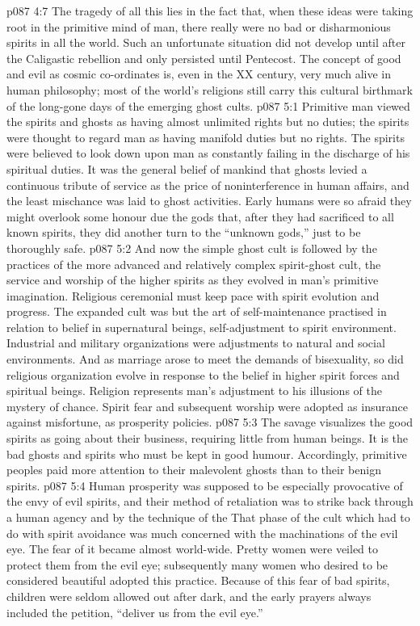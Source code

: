 \vs p087 4:7 The tragedy of all this lies in the fact that, when these ideas were taking root in the primitive mind of man, there really were no bad or disharmonious spirits in all the world. Such an unfortunate situation did not develop until after the Caligastic rebellion and only persisted until Pentecost. The concept of good and evil as cosmic co\hyp{}ordinates is, even in the XX century, very much alive in human philosophy; most of the world’s religions still carry this cultural birthmark of the long\hyp{}gone days of the emerging ghost cults.
\vs p087 5:1 Primitive man viewed the spirits and ghosts as having almost unlimited rights but no duties; the spirits were thought to regard man as having manifold duties but no rights. The spirits were believed to look down upon man as constantly failing in the discharge of his spiritual duties. It was the general belief of mankind that ghosts levied a continuous tribute of service as the price of noninterference in human affairs, and the least mischance was laid to ghost activities. Early humans were so afraid they might overlook some honour due the gods that, after they had sacrificed to all known spirits, they did another turn to the “unknown gods,” just to be thoroughly safe.
\vs p087 5:2 And now the simple ghost cult is followed by the practices of the more advanced and relatively complex spirit\hyp{}ghost cult, the service and worship of the higher spirits as they evolved in man’s primitive imagination. Religious ceremonial must keep pace with spirit evolution and progress. The expanded cult was but the art of self\hyp{}maintenance practised in relation to belief in supernatural beings, self\hyp{}adjustment to spirit environment. Industrial and military organizations were adjustments to natural and social environments. And as marriage arose to meet the demands of bisexuality, so did religious organization evolve in response to the belief in higher spirit forces and spiritual beings. Religion represents man’s adjustment to his illusions of the mystery of chance. Spirit fear and subsequent worship were adopted as insurance against misfortune, as prosperity policies.
\vs p087 5:3 The savage visualizes the good spirits as going about their business, requiring little from human beings. It is the bad ghosts and spirits who must be kept in good humour. Accordingly, primitive peoples paid more attention to their malevolent ghosts than to their benign spirits.
\vs p087 5:4 Human prosperity was supposed to be especially provocative of the envy of evil spirits, and their method of retaliation was to strike back through a human agency and by the technique of the  That phase of the cult which had to do with spirit avoidance was much concerned with the machinations of the evil eye. The fear of it became almost world\hyp{}wide. Pretty women were veiled to protect them from the evil eye; subsequently many women who desired to be considered beautiful adopted this practice. Because of this fear of bad spirits, children were seldom allowed out after dark, and the early prayers always included the petition, “deliver us from the evil eye.”
